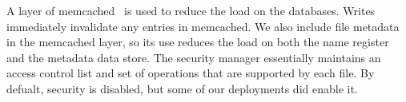 A layer of memcached~\cite{memcached} is used to reduce the load on the databases.  Writes immediately invalidate any entries in memcached.  
We also include file metadata in the memcached layer, so its use reduces the load on both the name register and the metadata data store.
The security manager essentially maintains an access control list and set of operations that are supported by each file.  By defualt, 
security is disabled, but some of our deployments did enable it.













